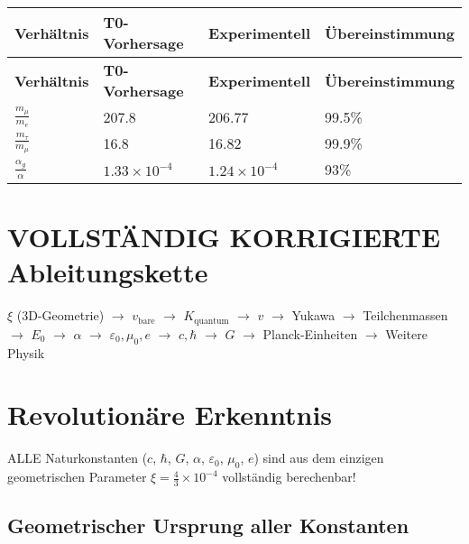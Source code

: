 \documentclass[12pt,a4paper]{article}
\begin{document}
	\begin{longtable}{|p{3cm}|p{3cm}|p{3cm}|p{3cm}|}
		\hline
		\textbf{Verhältnis} & \textbf{T0-Vorhersage} & \textbf{Experimentell} & \textbf{Übereinstimmung} \\
		\hline
		\endfirsthead
		\hline
		\textbf{Verhältnis} & \textbf{T0-Vorhersage} & \textbf{Experimentell} & \textbf{Übereinstimmung} \\
		\hline
		\endhead
		\(\frac{m_{\mu}}{m_e}\) & 207.8 & 206.77 & 99.5\% \\
		\hline
		\(\frac{m_{\tau}}{m_{\mu}}\) & 16.8 & 16.82 & 99.9\% \\
		\hline
		\(\frac{\alpha_g}{\alpha}\) & \(1.33 \times 10^{-4}\) & \(1.24 \times 10^{-4}\) & 93\% \\
		\hline
	\end{longtable}
	
	\section{VOLLSTÄNDIG KORRIGIERTE Ableitungskette}
	
	\begin{center}
		\(\xi\) (3D-Geometrie) \(\rightarrow\) \(v_{\text{bare}}\) \(\rightarrow\) \(K_{\text{quantum}}\) \(\rightarrow\) \(v\) \(\rightarrow\) Yukawa \(\rightarrow\) Teilchenmassen \(\rightarrow\) \(E_0\) \(\rightarrow\) \(\alpha\) \(\rightarrow\) \(\varepsilon_0, \mu_0, e\) \(\rightarrow\) \(c, \hbar\) \(\rightarrow\) \(G\) \(\rightarrow\) Planck-Einheiten \(\rightarrow\) Weitere Physik
	\end{center}
	
	\section{Revolutionäre Erkenntnis}
	
	ALLE Naturkonstanten (\(c\), \(\hbar\), \(G\), \(\alpha\), \(\varepsilon_0\), \(\mu_0\), \(e\)) sind aus dem einzigen geometrischen Parameter \(\xi = \frac{4}{3} \times 10^{-4}\) vollständig berechenbar!
	
	\subsection{Geometrischer Ursprung aller Konstanten}
	
\end{document}
